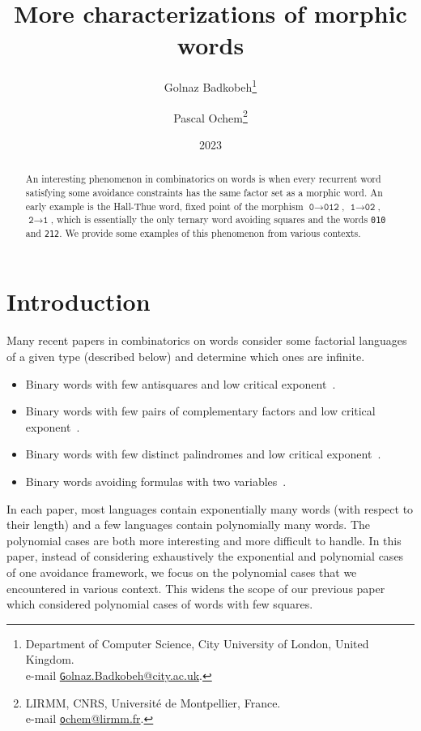 \documentclass{article}
\title{More characterizations of morphic words}
\author{
Golnaz Badkobeh\footnote{Department of Computer Science, City University of London, United Kingdom.\\
e-mail \href{mailto:Golnaz.Badkobeh@city.ac.uk}{\texttt Golnaz.Badkobeh@city.ac.uk}.}
\and
Pascal Ochem\footnote{LIRMM, CNRS, Universit\'e de Montpellier, France.\\
e-mail \href{mailto:ochem@lirmm.fr}{\texttt ochem@lirmm.fr}.}}
\date{2023}
\theoremstyle{plain}
\theoremstyle{definition}
\theoremstyle{remark}
\begin{document}
\maketitle

\begin{abstract}
An interesting phenomenon in combinatorics on words is when every recurrent word satisfying
some avoidance constraints has the same factor set as a morphic word.
An early example is the Hall-Thue word, fixed point of the morphism
$\texttt{0}\to\texttt{012}$, $\texttt{1}\to\texttt{02}$, $\texttt{2}\to\texttt{1}$,
which is essentially the only ternary word avoiding squares and the words \texttt{010} and \texttt{212}.
We provide some examples of this phenomenon from various contexts.
\end{abstract}

\section{Introduction}\label{sec:intro}
Many recent papers in combinatorics on words consider some factorial languages of a given type (described below) and
determine which ones are infinite.
\begin{itemize}
\item Binary words with few antisquares and low critical exponent~\cite{BCMORS2023}.
\item Binary words with few pairs of complementary factors and low critical exponent~\cite{CDOORS2023}.
\item Binary words with few distinct palindromes and low critical exponent~\cite{DOO2023}.
\item Binary words avoiding formulas with two variables~\cite{OchemRosenfeld2016}.
\end{itemize}
In each paper, most languages contain exponentially many words (with respect to their length)
and a few languages contain polynomially many words. The polynomial cases are both more interesting
and more difficult to handle. In this paper, instead of considering exhaustively the
exponential and polynomial cases of one avoidance framework, we focus on the polynomial cases
that we encountered in various context. This widens the scope of our previous paper~\cite{BO15}
which considered polynomial cases of words with few squares.
\end{document}
